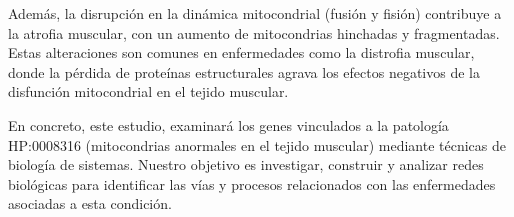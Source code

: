 Además, la disrupción en la dinámica mitocondrial (fusión y fisión) contribuye a la atrofia muscular, con un aumento de mitocondrias hinchadas y fragmentadas. Estas alteraciones son comunes en enfermedades como la distrofia muscular, donde la pérdida de proteínas estructurales agrava los efectos negativos de la disfunción mitocondrial en el tejido muscular.

En concreto, este estudio, examinará los genes vinculados a la patología HP:0008316 (mitocondrias anormales en el tejido muscular) mediante técnicas de biología de sistemas. Nuestro objetivo es investigar, construir y analizar redes biológicas para identificar las vías y procesos relacionados con las enfermedades asociadas a esta condición.

